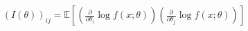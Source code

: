\documentclass[preview]{standalone}
\begin{document}
\begin{align*}
(I(\theta))_{ij} = \mathbb{E}\left[\left(\frac{\partial}{\partial \theta_i} \log f(x;\theta)\right)\left(\frac{\partial}{\partial \theta_j} \log f(x;\theta)\right)\right]
\end{align*}
\end{document}
